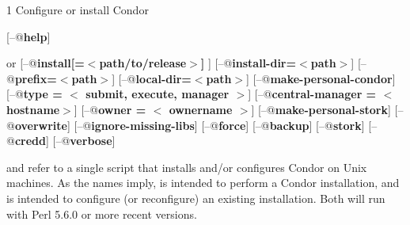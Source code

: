 \begin{ManPage}{\label{man-condor-configure}}{1}
{Configure or install Condor}

\Synopsis {}
[\verb@--@\textbf{help}]

 or 
[\verb@--@\textbf{install[=$<$path/to/release$>$] }]
[\verb@--@\textbf{install-dir=$<$path$>$}]
[\verb@--@\textbf{prefix=$<$path$>$}]
[\verb@--@\textbf{local-dir=$<$path$>$}]
[\verb@--@\textbf{make-personal-condor}]
[\verb@--@\textbf{type = $<$ submit, execute, manager $>$}]
[\verb@--@\textbf{central-manager = $<$ hostname$>$}]
[\verb@--@\textbf{owner = $<$ ownername $>$}]
[\verb@--@\textbf{make-personal-stork}]
[\verb@--@\textbf{overwrite}]
[\verb@--@\textbf{ignore-missing-libs}]
[\verb@--@\textbf{force}]
[\verb@--@\textbf{backup}]
[\verb@--@\textbf{stork}]
[\verb@--@\textbf{credd}]
[\verb@--@\textbf{verbose}]






\Description 

 and  refer to a single script that installs
and/or configures Condor on Unix machines.  As the names imply,
 is intended to perform a Condor installation, and
 is intended to configure (or reconfigure) an
existing installation.
Both will run with Perl 5.6.0 or more recent versions.


\end{ManPage}
